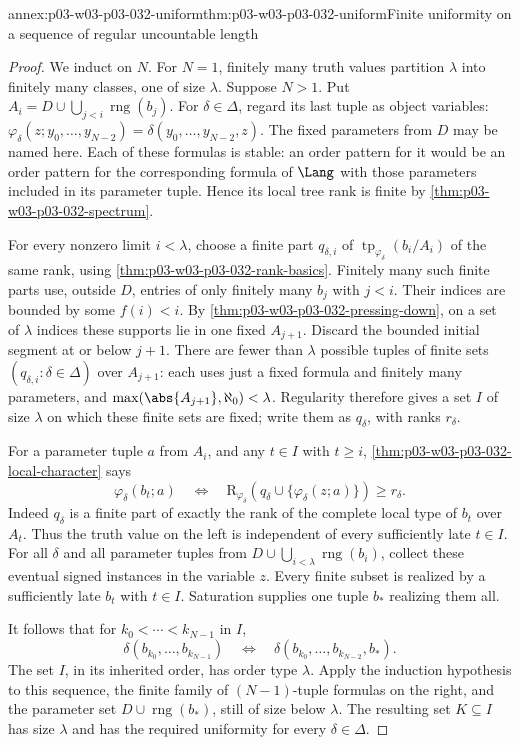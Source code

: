\begin{annexitem}{annex:p03-w03-p03-032-uniform}{thm:p03-w03-p03-032-uniform}{Finite uniformity on a sequence of regular uncountable length}
\begin{proof}
We induct on \(N\).  For \(N=1\), finitely many truth values partition
\(\lambda\) into finitely many classes, one of size \(\lambda\).  Suppose
\(N>1\).  Put \(A_i=D\cup\bigcup_{j<i}\operatorname{rng}(b_j)\).
For \(\delta\in\Delta\), regard its last tuple as object variables:
\(\varphi_\delta(z;y_0,\ldots,y_{N-2})=
\delta(y_0,\ldots,y_{N-2},z)\).  The fixed parameters from \(D\) may be
named here.  Each of these formulas is stable: an order pattern for it
would be an order pattern for the corresponding formula of \(\Lang\)
with those parameters included in its parameter tuple.  Hence its local
tree rank is finite by \cref{thm:p03-w03-p03-032-spectrum}.

For every nonzero limit \(i<\lambda\), choose a finite part
\(q_{\delta,i}\) of \(\operatorname{tp}_{\varphi_\delta}(b_i/A_i)\)
of the same rank, using \cref{thm:p03-w03-p03-032-rank-basics}.  Finitely
many such finite parts use, outside \(D\), entries of only finitely many
\(b_j\) with \(j<i\).  Their indices are bounded by some \(f(i)<i\).
By \cref{thm:p03-w03-p03-032-pressing-down}, on a set of \(\lambda\)
indices these supports lie in one fixed \(A_{j+1}\).  Discard the bounded
initial segment at or below \(j+1\).  There are fewer than \(\lambda\)
possible tuples of finite sets \((q_{\delta,i}:\delta\in\Delta)\) over
\(A_{j+1}\): each uses just a fixed formula and finitely many parameters,
and \(\max(\abs{A_{j+1}},\aleph_0)<\lambda\).  Regularity therefore gives
a set \(I\) of size \(\lambda\) on which these finite sets are fixed;
write them as \(q_\delta\), with ranks \(r_\delta\).

For a parameter tuple \(a\) from \(A_i\), and any \(t\in I\) with
\(t\geq i\), \cref{thm:p03-w03-p03-032-local-character} says
\[
 \varphi_\delta(b_t;a)\quad\Longleftrightarrow\quad
 \mathrm R_{\varphi_\delta}
       (q_\delta\cup\{\varphi_\delta(z;a)\})\geq r_\delta.
\]
Indeed \(q_\delta\) is a finite part of exactly the rank of the complete
local type of \(b_t\) over \(A_t\).  Thus the truth value on the left is
independent of every sufficiently late \(t\in I\).  For all \(\delta\)
and all parameter tuples from \(D\cup\bigcup_{i<\lambda}
\operatorname{rng}(b_i)\), collect these eventual signed instances in the
variable \(z\).  Every finite subset is realized by a sufficiently late
\(b_t\) with \(t\in I\).  Saturation supplies one tuple \(b_*\)
realizing them all.

It follows that for \(k_0<\cdots<k_{N-1}\) in \(I\),
\[
 \delta(b_{k_0},\ldots,b_{k_{N-1}})
 \quad\Longleftrightarrow\quad
 \delta(b_{k_0},\ldots,b_{k_{N-2}},b_*).
\]
The set \(I\), in its inherited order, has order type \(\lambda\).
Apply the induction hypothesis to this sequence, the finite family of
\((N-1)\)-tuple formulas on the right, and the parameter set
\(D\cup\operatorname{rng}(b_*)\), still of size below \(\lambda\).
The resulting set \(K\subseteq I\) has size \(\lambda\) and has the
required uniformity for every \(\delta\in\Delta\).
\end{proof}
\end{annexitem}

